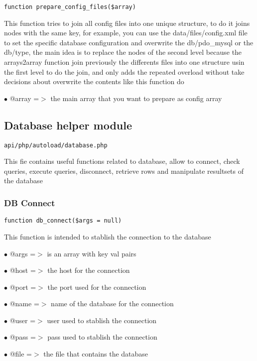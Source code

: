 \documentclass[a4paper]{article}
\begin{document}
\begin{lstlisting}
function prepare_config_files($array)
\end{lstlisting}

This function tries to join all config files into one unique structure, to do it
joins nodes with the same key, for example, you can use the data/files/config.xml
file to set the specific database configuration and overwrite the db/pdo\_mysql or
the db/type, the main idea is to replace the nodes of the second level because the
arrays2array function join previously the differents files into one structure usin
the first level to do the join, and only adds the repeated overload without take
decisions about overwrite the contents like this function do

\begin{compactitem}
\item[\color{myblue}$\bullet$] @array =$>$ the main array that you want to prepare as config array
\end{compactitem}

\hypertarget{toc83}{}
\subsection{Database helper module}

\begin{lstlisting}
api/php/autoload/database.php
\end{lstlisting}

This fie contains useful functions related to database, allow to connect, check queries, execute
queries, disconnect, retrieve rows and manipulate resultsets of the database

\hypertarget{toc84}{}
\subsubsection{DB Connect}

\begin{lstlisting}
function db_connect($args = null)
\end{lstlisting}

This function is intended to stablish the connection to the database

\begin{compactitem}
\item[\color{myblue}$\bullet$] @args =$>$ is an array with key val pairs
\item[\color{myblue}$\bullet$] @host =$>$ the host for the connection
\item[\color{myblue}$\bullet$] @port =$>$ the port used for the connection
\item[\color{myblue}$\bullet$] @name =$>$ name of the database for the connection
\item[\color{myblue}$\bullet$] @user =$>$ user used to stablish the connection
\item[\color{myblue}$\bullet$] @pass =$>$ pass used to stablish the connection
\item[\color{myblue}$\bullet$] @file =$>$ the file that contains the database
\end{compactitem}
\end{document}
